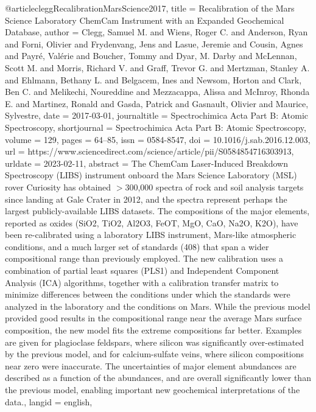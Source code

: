 @article{cleggRecalibrationMarsScience2017,
  title = {Recalibration of the {{Mars Science Laboratory ChemCam}} Instrument with an Expanded Geochemical Database},
  author = {Clegg, Samuel M. and Wiens, Roger C. and Anderson, Ryan and Forni, Olivier and Frydenvang, Jens and Lasue, Jeremie and Cousin, Agnes and Payré, Valérie and Boucher, Tommy and Dyar, M. Darby and McLennan, Scott M. and Morris, Richard V. and Graff, Trevor G. and Mertzman, Stanley A. and Ehlmann, Bethany L. and Belgacem, Ines and Newsom, Horton and Clark, Ben C. and Melikechi, Noureddine and Mezzacappa, Alissa and McInroy, Rhonda E. and Martinez, Ronald and Gasda, Patrick and Gasnault, Olivier and Maurice, Sylvestre},
  date = {2017-03-01},
  journaltitle = {Spectrochimica Acta Part B: Atomic Spectroscopy},
  shortjournal = {Spectrochimica Acta Part B: Atomic Spectroscopy},
  volume = {129},
  pages = {64--85},
  issn = {0584-8547},
  doi = {10.1016/j.sab.2016.12.003},
  url = {https://www.sciencedirect.com/science/article/pii/S0584854716303913},
  urldate = {2023-02-11},
  abstract = {The ChemCam Laser-Induced Breakdown Spectroscopy (LIBS) instrument onboard the Mars Science Laboratory (MSL) rover Curiosity has obtained {$>$}300,000 spectra of rock and soil analysis targets since landing at Gale Crater in 2012, and the spectra represent perhaps the largest publicly-available LIBS datasets. The compositions of the major elements, reported as oxides (SiO2, TiO2, Al2O3, FeOT, MgO, CaO, Na2O, K2O), have been re-calibrated using a laboratory LIBS instrument, Mars-like atmospheric conditions, and a much larger set of standards (408) that span a wider compositional range than previously employed. The new calibration uses a combination of partial least squares (PLS1) and Independent Component Analysis (ICA) algorithms, together with a calibration transfer matrix to minimize differences between the conditions under which the standards were analyzed in the laboratory and the conditions on Mars. While the previous model provided good results in the compositional range near the average Mars surface composition, the new model fits the extreme compositions far better. Examples are given for plagioclase feldspars, where silicon was significantly over-estimated by the previous model, and for calcium-sulfate veins, where silicon compositions near zero were inaccurate. The uncertainties of major element abundances are described as a function of the abundances, and are overall significantly lower than the previous model, enabling important new geochemical interpretations of the data.},
  langid = {english},
}

